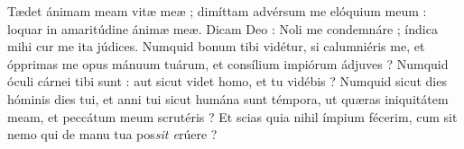 \lettrine{T}{}ædet ánimam meam vitæ meæ ; dimíttam advérsum me elóquium meum : loquar in amaritúdine ánimæ meæ.
Dicam Deo : Noli me condemnáre ; índica mihi cur me ita júdices.
Numquid bonum tibi vidétur, si calumniéris me, et ópprimas me opus mánuum tuárum, et consílium impiórum ádjuves ?
Numquid óculi cárnei tibi sunt : aut sicut videt homo, et tu vidébis ?
Numquid sicut dies hóminis dies tui, et anni tui sicut humána sunt témpora,
ut quæras iniquitátem meam, et peccátum meum scrutéris ?
Et scias quia nihil ímpium fécerim, cum sit nemo qui de manu tua pos\textit{sit e}rúere ?